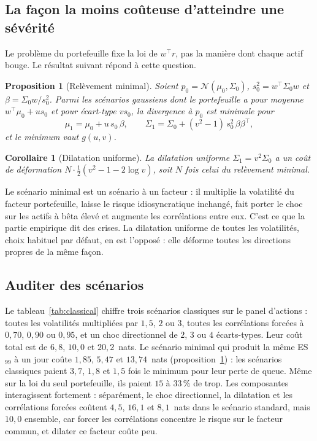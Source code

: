 \documentclass[12pt]{article}
\newtheorem{proposition}{Proposition}
\newtheorem{corollary}{Corollaire}
\theoremstyle{definition}
\begin{document}
\begin{doublespace}
\subsection{La façon la moins coûteuse d'atteindre une sévérité}

Le problème du portefeuille fixe la loi de $w^\top r$, pas la manière dont
chaque actif bouge. Le résultat suivant répond à cette question.

\begin{proposition}[Relèvement minimal]
\label{prop:lift}
Soient $p_0=\mathcal N(\mu_0,\Sigma_0)$, $s_0^2=w^\top\Sigma_0w$ et
$\beta=\Sigma_0w/s_0^2$. Parmi les scénarios gaussiens dont le portefeuille a
pour moyenne $w^\top\mu_0+us_0$ et pour écart-type $vs_0$, la divergence à
$p_0$ est minimale pour
\begin{equation}
\label{eq:lift}
\mu_1=\mu_0+u\,s_0\,\beta,\qquad\Sigma_1=\Sigma_0+(v^2-1)\,s_0^2\,\beta\beta^\top,
\end{equation}
et le minimum vaut $g(u,v)$.
\end{proposition}

\begin{corollary}[Dilatation uniforme]
\label{cor:uniform}
La dilatation uniforme $\Sigma_1=v^2\Sigma_0$ a un coût de déformation
$N\cdot\tfrac12(v^2-1-2\log v)$, soit $N$ fois celui du relèvement minimal.
\end{corollary}

Le scénario minimal est un scénario à un facteur : il multiplie la volatilité
du facteur portefeuille, laisse le risque idiosyncratique inchangé, fait
porter le choc sur les actifs à bêta élevé et augmente les corrélations entre
eux. C'est ce que la partie empirique dit des crises. La dilatation uniforme
de toutes les volatilités, choix habituel par défaut, en est l'opposé : elle
déforme toutes les directions propres de la même façon.

\subsection{Auditer des scénarios}

Le tableau~\ref{tab:classical} chiffre trois scénarios classiques sur le
panel d'actions : toutes les volatilités multipliées par $1{,}5$, $2$ ou $3$,
toutes les corrélations forcées à $0{,}70$, $0{,}90$ ou $0{,}95$, et un choc
directionnel de $2$, $3$ ou $4$ écarts-types. Leur coût total est de $6{,}8$,
$10{,}0$ et $20{,}2$~nats. Le scénario minimal qui produit la même ES$_{99}$ à
un jour coûte $1{,}85$, $5{,}47$ et $13{,}74$~nats
(proposition~\ref{prop:lift}) : les scénarios classiques paient $3{,}7$,
$1{,}8$ et $1{,}5$ fois le minimum pour leur perte de queue. Même sur la loi
du seul portefeuille, ils paient $15$ à $33\,\%$ de trop. Les composantes
interagissent fortement : séparément, le choc directionnel, la dilatation et
les corrélations forcées coûtent $4{,}5$, $16{,}1$ et $8{,}1$~nats dans le
scénario standard, mais $10{,}0$ ensemble, car forcer les corrélations
concentre le risque sur le facteur commun, et dilater ce facteur coûte peu.


\end{doublespace}
\end{document}
